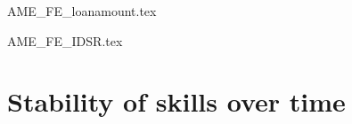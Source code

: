 \documentclass[a4paper, 12pt, onecolumn]{article}
\begin{document}
{AME_FE_loanamount.tex}

{AME_FE_IDSR.tex}



\clearpage
\newpage
\appendix
{}









\section{Stability of skills over time}
\label{section:stab_big5}


\end{document}
